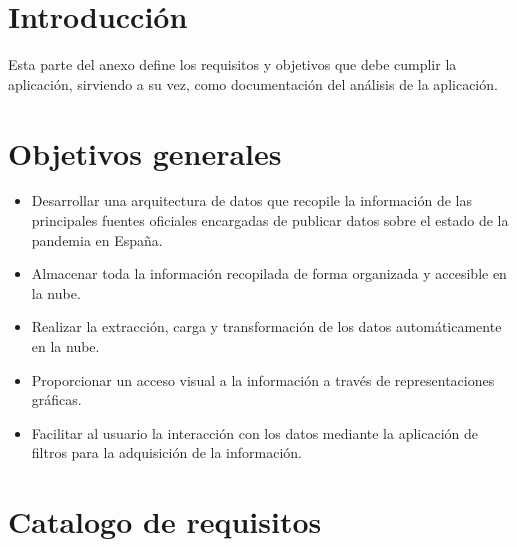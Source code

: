 
\section{Introducción}
Esta parte del anexo define los requisitos y objetivos que debe cumplir la aplicación, sirviendo a su vez, como documentación del análisis de la aplicación.

\section{Objetivos generales}


\begin{itemize}
    \item Desarrollar una arquitectura de datos que recopile la información de las principales fuentes oficiales encargadas de publicar datos sobre el estado de la pandemia en España.
    \item Almacenar toda la información recopilada de forma organizada y accesible en la nube.
    \item Realizar la extracción, carga y transformación de los datos automáticamente en la nube.
    \item Proporcionar un acceso visual a la información a través de representaciones gráficas.
    \item Facilitar al usuario la interacción con los datos mediante la aplicación de filtros para la adquisición de la información.
\end{itemize}

\section{Catalogo de requisitos}
